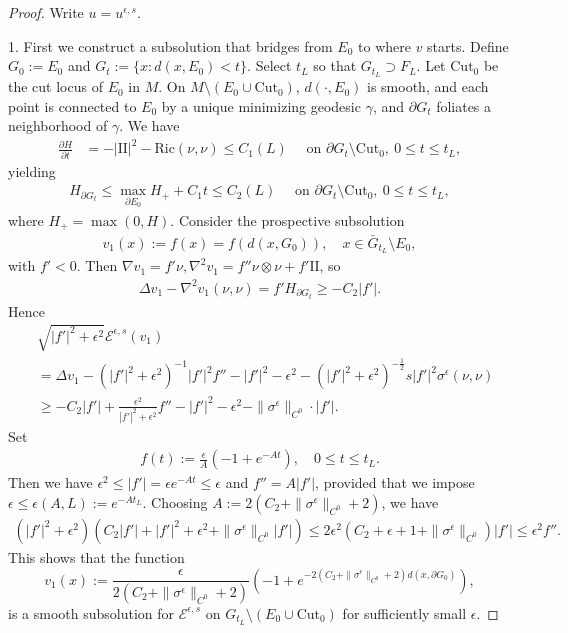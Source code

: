 \documentclass[10pt,a4paper]{amsart}
\begin{document}
\begin{proof}
	Write $u = u ^{\epsilon ,s}$. 

	1. First we construct a subsolution that bridges from $E_0$ to where $v$ starts. Define $G_0 := E_0$ and $G_t := \{x: d(x, E_0) < t\} $. Select $t_L$ so that $G_{t_L} \supset F_L$. Let $\mathrm{Cut}_0$ be the cut locus of $E_0$ in $M$. On $M \setminus (E_0 \cup \mathrm{Cut}_0)$, $d(\cdot , E_0)$ is smooth, and each point is connected to $E_0$ by a unique minimizing geodesic $\gamma $, and $\partial G_t$ foliates a neighborhood of $\gamma $. We have
	\begin{align*}
		\frac{\partial H}{\partial t} &= - |\mathrm{II}|^2 - \mathrm{Ric}(\nu ,\nu ) \leq C_1(L)\quad  \text{ on } \partial G_t \setminus \mathrm{Cut}_0, \ 0 \leq t \leq t_L,
	\end{align*} 
	yielding
	\begin{align*}
		H_{\partial G_t} \leq \max_{\partial E_0} H_{+} + C_1 t \leq C_2(L) \quad  \text{ on } \partial G_t \setminus \mathrm{Cut}_0, \ 0 \leq t \leq t_L,
	\end{align*} 
	where $H_{+} = \max (0, H)$.  Consider the prospective subsolution
	\begin{align*}
		v_1(x) := f(x) = f(d(x, G_0) ),\quad x \in \bar{G}_{t_L}\setminus E_0,
	\end{align*} 
	with $f'<0$. Then $\nabla v_1 = f' \nu , \nabla ^2 v_1 = f'' \nu \otimes \nu + f' \mathrm{II}$, so
	\begin{align*}
		\Delta v_1 - \nabla ^2 v_1(\nu ,\nu ) = f' H_{\partial G_t} \geq - C_2|f'| .
	\end{align*} 
	Hence
	\begin{align*}
		&\sqrt{|f'|^2+ \epsilon ^2} \mathcal{E}^{\epsilon ,s}(v_1) \\
		&= \Delta v_1 -  \left( |f'|^2 + \epsilon ^2 \right) ^{-1} |f'|^2 f'' - |f'|^2- \epsilon ^2 - \left( |f'|^2+ \epsilon ^2 \right) ^{-\frac{1}{2}} s|f'|^2 \sigma ^{\epsilon } (\nu ,\nu ) \\
		&\geq -C_2 |f'| + \frac{\epsilon ^2}{|f'|^2+ \epsilon ^2} f''- |f'|^2- \epsilon ^2 - \|\sigma ^{\epsilon } \|_{C^0}\cdot |f'|.
	\end{align*} 
	Set
	\begin{align*}
		f(t) := \frac{\epsilon }{A}(-1 + e ^{-A t}),\quad 0 \leq t \leq t_L	.
	\end{align*} 
	Then we have $\epsilon ^2 \leq |f'| = \epsilon e^{-At} \leq \epsilon $ and $f''  = A |f'|$, provided that we impose $\epsilon \leq \epsilon (A,L):= e^{-A t_L}$. Choosing $A:= 2(C_2+\|\sigma^{\epsilon } \|_{C^0}+2)$, we have
	\begin{align*}
		(|f'|^2+ \epsilon ^2) \left( C_2|f'| + |f'|^2 + \epsilon ^2 + \|\sigma^{\epsilon } \|_{C^0} |f'| \right) \leq 2 \epsilon ^2 \left( C_2 + \epsilon + 1+ \|\sigma^{\epsilon } \|_{C^0} \right)  |f'| \leq \epsilon ^2 f''. 
	\end{align*} 
	This shows that the function
	$$v_1(x) := \frac{\epsilon }{2(C_2+\|\sigma ^{\epsilon } \|_{C^0} + 2)} \left( -1 + e^{- 2(C_2+\|\sigma ^{\epsilon } \|_{C^0}+2) d(x, \partial G_0)} \right) ,$$ 
	is a smooth subsolution for $\mathcal{E}^{\epsilon ,s}$ on $G_{t_L} \setminus (E_0 \cup \mathrm{Cut}_0)$ for sufficiently small $\epsilon $.


\end{proof}
\end{document}
